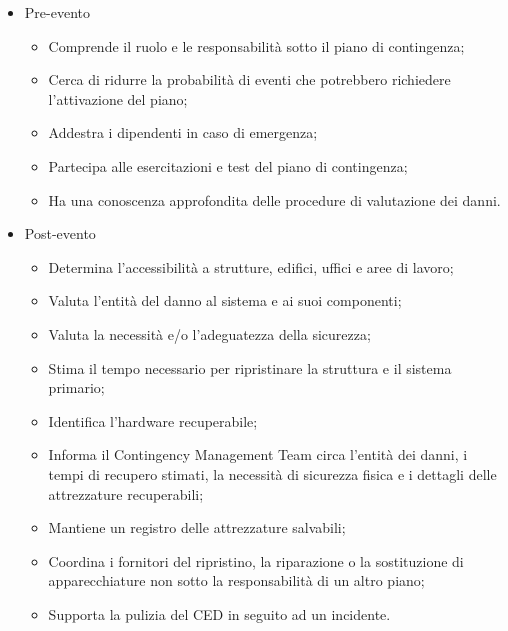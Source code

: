 \documentclass[12pt, a4paper, titlepage]{report}
\begin{document}
			\begin{itemize}
				\item Pre-evento
				\begin{itemize}
					\item Comprende il ruolo e le responsabilità sotto il piano di contingenza;
					\item Cerca di ridurre la probabilità di eventi che potrebbero richiedere l'attivazione del piano;
					\item Addestra i dipendenti in caso di emergenza;
					\item Partecipa alle esercitazioni e test del piano di contingenza;
					\item Ha una conoscenza approfondita delle procedure di valutazione dei danni.
				\end{itemize}
				\item Post-evento
				\begin{itemize}
					\item Determina l'accessibilità a strutture, edifici, uffici e aree di lavoro;
					\item Valuta l'entità del danno al sistema e ai suoi componenti;
					\item Valuta la necessità e/o l'adeguatezza della sicurezza;
					\item Stima il tempo necessario per ripristinare la struttura e il sistema primario;
					\item Identifica l'hardware recuperabile;
					\item Informa il Contingency Management Team circa l'entità dei danni, i tempi di recupero stimati, la necessità di sicurezza fisica e i dettagli delle attrezzature recuperabili;
					\item Mantiene un registro delle attrezzature salvabili;
					\item Coordina i fornitori del ripristino, la riparazione o la sostituzione di apparecchiature non sotto la responsabilità di un altro piano;
					\item Supporta la pulizia del CED in seguito ad un incidente.
				\end{itemize}
			\end{itemize}		
			
\end{document}
